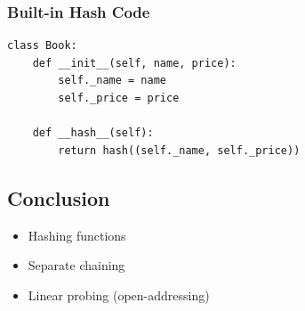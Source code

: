 \documentclass[aspectratio=169, 14pt]{beamer}
\begin{document}
\begin{frame}[fragile]
    \frametitle{Built-in Hash Code}

    \begin{verbatim}
class Book:
    def __init__(self, name, price):
        self._name = name
        self._price = price

    def __hash__(self):
        return hash((self._name, self._price))
    \end{verbatim}

\end{frame}

\begin{frame}

    \section{\textcolor{darkmidnightblue}{Conclusion}}
    \begin{itemize}
        \item Hashing functions
        \item Separate chaining
        \item Linear probing (open-addressing)
    \end{itemize}
\end{frame}
\end{document}
